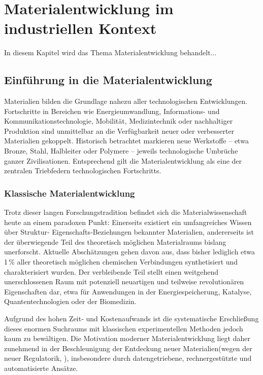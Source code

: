 \chapter{Materialentwicklung im industriellen Kontext}
In diesem Kapitel wird das Thema Materialentwicklung behandelt...
\section {Einführung in die Materialentwicklung}

Materialien bilden die Grundlage nahezu aller technologischen Entwicklungen. Fortschritte in Bereichen wie Energieumwandlung, Informations- und Kommunikationstechnologie, Mobilität, Medizintechnik oder nachhaltiger Produktion sind unmittelbar an die Verfügbarkeit neuer oder verbesserter Materialien gekoppelt. Historisch betrachtet markieren neue Werkstoffe – etwa Bronze, Stahl, Halbleiter oder Polymere – jeweils technologische Umbrüche ganzer Zivilisationen. Entsprechend gilt die Materialentwicklung als eine der zentralen Triebfedern technologischen Fortschritts. \cite{kroon2008small}



\subsection{Klassische Materialentwicklung}

Trotz dieser langen Forschungstradition befindet sich die Materialwissenschaft heute an einem paradoxen Punkt: Einerseits existiert ein umfangreiches Wissen über Struktur‑ Eigenschafts‑Beziehungen bekannter Materialien, andererseits ist der überwiegende Teil des theoretisch möglichen Materialraums bislang unerforscht. Aktuelle Abschätzungen gehen davon aus, dass bisher lediglich etwa 1\,\% aller theoretisch möglichen chemischen Verbindungen synthetisiert und charakterisiert wurden. Der verbleibende Teil stellt einen weitgehend unerschlossenen Raum mit potenziell neuartigen und teilweise revolutionären Eigenschaften dar, etwa für Anwendungen in der Energiespeicherung, Katalyse, Quantentechnologien oder der Biomedizin. \cite{xiang1995combinatorial}

Aufgrund des hohen Zeit‑ und Kostenaufwands ist die systematische Erschließung dieses enormen Suchraums mit klassischen experimentellen Methoden jedoch kaum zu bewältigen. Die Motivation moderner Materialentwicklung liegt daher zunehmend in der Beschleunigung der Entdeckung neuer Materialien(wegen der neuer Regulatorik, ), insbesondere durch datengetriebene, rechnergestützte und automatisierte Ansätze. \cite{tomlinson2010principles}

